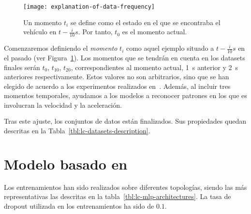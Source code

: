 \begin{figure}[t]
	\centering
	\texttt{[image: explanation-of-data-frequency]}
	\caption[Momento $t_i$ en el conjunto de datos]{Un momento $t_i$ se define como el estado en el que se encontraba el vehículo en $t - \frac{i}{10}s$. Por tanto, $t_0$ es el momento actual.}
	\label{fig:moments-illustration}
\end{figure}

Comenzaremos definiendo el \textit{momento} $t_i$ como aquel ejemplo situado a $t - \frac{i}{10}s$ en el pasado (ver Figura~\ref{fig:moments-illustration}). Los momentos que se tendrán en cuenta en los datasets finales serán $t_0$, $t_10$, $t_20$, correspondientes al momento actual, \SI{1}{\second} anterior y \SI{2}{\second} anteriores respectivamente. Estos valores no son arbitrarios, sino que se han elegido de acuerdo a los experimentos realizados en~\cite{diaz2018modelling}. Además, al incluir tres momentos temporales, ayudamos a los modelos a reconocer patrones en los que es involucran la velocidad y la aceleración.

Tras este ajuste, los conjuntos de datos están finalizados. Sus propiedades quedan descritas en la Tabla~\ref{tbl:lc-datasets-description}.

\section{Modelo basado en }

Los entrenamientos han sido realizados sobre diferentes topologías, siendo las más representativas las descritas en la tabla~\ref{tbl:lc-mlp-architectures}. La tasa de dropout utilizada en los entrenamientos ha sido de $0.1$.

